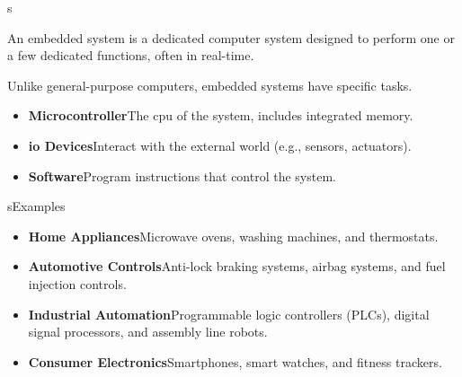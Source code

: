\begin{frame}{s}%
    \par An embedded system is a dedicated computer system designed to perform one or a few dedicated functions, often in real-time.
    \par Unlike general-purpose computers, embedded systems have specific tasks.

    \begin{itemize}
        \item \textbf{Microcontroller}\newline The \acl{cpu} of the system, includes integrated memory.
        \item \textbf{\acs{io} Devices}\newline Interact with the external world (e.g., sensors, actuators).
        \item \textbf{Software}\newline Program instructions that control the system.
    \end{itemize}
\end{frame}

\begin{frame}{s}{Examples}
    \begin{itemize}
        \item \textbf{Home Appliances}\newline Microwave ovens, washing machines, and thermostats.
        \item \textbf{Automotive Controls}\newline Anti-lock braking systems, airbag systems, and fuel injection controls.
        \item \textbf{Industrial Automation}\newline Programmable logic controllers (PLCs), digital signal processors, and assembly line robots.
        \item \textbf{Consumer Electronics}\newline Smartphones, smart watches, and fitness trackers.
    \end{itemize}
\end{frame}

